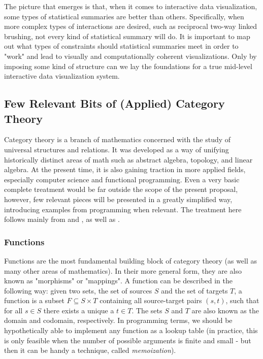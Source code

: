 \documentclass[12pt,a4paper]{article}
\begin{document}
The picture that emerges is that, when it comes to interactive data visualization, some types of statistical summaries are better than others. Specifically, when more complex types of interactions are desired, such as reciprocal two-way linked brushing, not every kind of statistical summary will do. It is important to map out what types of constraints should statistical summaries meet in order to "work" and lead to visually and computationally coherent visualizations. Only by imposing some kind of structure can we lay the foundations for a true mid-level interactive data visualization system. 


\subsection{Few Relevant Bits of (Applied) Category Theory}

Category theory is a branch of mathematics concerned with the study of universal structures and relations. It was developed as a way of unifying historically distinct areas of math such as abstract algebra, topology, and linear algebra. At the present time, it is also gaining traction in more applied fields, especially computer science and functional programming. Even a very basic complete treatment would be far outside the scope of the present proposal, however, few relevant pieces will be presented in a greatly simplified way, introducing examples from programming when relevant. The treatment here follows mainly from \cite{fong2019} and \cite{Milewski2018}, as well as \cite{leinster2014}.

\subsubsection{Functions}
\label{sec:functions}

Functions are the most fundamental building block of category theory (as well as many other areas of mathematics). In their more general form, they are also known as "morphisms" or "mappings". A function can be described in the following way: given two sets, the set of sources $S$ and the set of targets $T$, a function is a subset $F \subseteq S \times T$ containing all source-target pairs $(s, t)$, such that for all $s \in S$ there exists a unique a $t \in T$. The sets $S$ and $T$ are also known as the domain and codomain, respectively. In programming terms, we should be hypothetically able to implement any function as a lookup table (in practice, this is only feasible when the number of possible arguments is finite and small - but then it can be handy a technique, called \textit{memoization}).  
\end{document}
